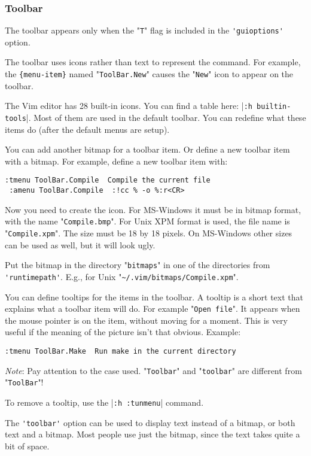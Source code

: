 \subsubsection{Toolbar}
The toolbar appears only when the "\verb!T!" flag is included in the \verb!'guioptions'! option.

The toolbar uses icons rather than text to represent the command.
For example, the \verb!{menu-item}! named "\verb!ToolBar.New!" causes the "\verb!New!" icon to appear on the toolbar.

The Vim editor has 28 built-in icons.
You can find a table here: |\verb!:h builtin-tools!|.
Most of them are used in the default toolbar.
You can redefine what these items do (after the default menus are setup).

You can add another bitmap for a toolbar item.
Or define a new toolbar item with a bitmap.
For example, define a new toolbar item with:

\begin{Verbatim}[samepage=true]
 :tmenu ToolBar.Compile  Compile the current file
 :amenu ToolBar.Compile  :!cc % -o %:r<CR>
\end{Verbatim}

Now you need to create the icon.
For MS-Windows it must be in bitmap format, with the name "\verb!Compile.bmp!".
For Unix XPM format is used, the file name is "\verb!Compile.xpm!".
The size must be 18 by 18 pixels.
On MS-Windows other sizes can be used as well, but it will look ugly.

Put the bitmap in the directory "\verb!bitmaps!" in one of the directories from \verb!'runtimepath'!.
E.g., for Unix "\verb!~/.vim/bitmaps/Compile.xpm!".

You can define tooltips for the items in the toolbar.
A tooltip is a short text that explains what a toolbar item will do.
For example "\verb!Open file!".
It appears when the mouse pointer is on the item, without moving for a moment.
This is very useful if the meaning of the picture isn't that obvious.
Example:

\begin{Verbatim}[samepage=true]
 :tmenu ToolBar.Make  Run make in the current directory
\end{Verbatim}
 
\emph{Note}: Pay attention to the case used.
"\verb!Toolbar!" and "\verb!toolbar!" are different from "\verb!ToolBar!"!

To remove a tooltip, use the |\verb!:h :tunmenu!| command.

The \verb!'toolbar'! option can be used to display text instead of a bitmap, or both text and a bitmap.
Most people use just the bitmap, since the text takes quite a bit of space.

